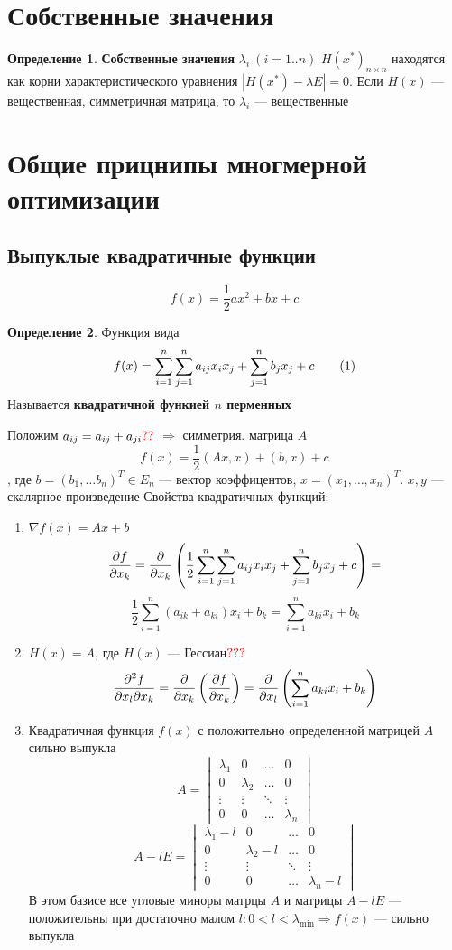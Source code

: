 \documentclass[oneside]{book}
\newcommand\addtag{\refstepcounter{equation}\tag{\theequation}}
\theoremstyle{plain}
\theoremstyle{remark}
\theoremstyle{definition}
\newtheorem*{definition}{Определение}
\begin{document}
\section{Собственные значения}
\label{sec:orgc81b7ec}
\begin{definition}
\textbf{Собственные значения} \(\lambda_i\ (i = 1..n)\) \(H(x^*)_{n\times n}\) находятся как корни характеристического уравнения \(|H(x^*) - \lambda E| = 0\). Если \(H(x)\) --- вещественная, симметричная матрица, то \(\lambda_i\) --- вещественные
\end{definition}
\section{Общие прицнипы многмерной оптимизации}
\label{sec:org3689cce}
\subsection{Выпуклые квадратичные функции}
\label{sec:orgb4e7a9f}
\[ f(x) = \frac{1}{2}ax^2 + bx + c \]
\begin{definition}
Функция вида
\[ f(x) = \sum^n_{i = 1}\sum^n_{j = 1}a_{ij}x_ix_j + \sum^n_{j = 1}b_j x_j + c \addtag\label{7_1_quad} \]
Называется \textbf{квадратичной функией \(n\) перменных}
\end{definition}
Положим \(a_{ij} = a_{ij} + a_{ji} {\color{red}??}\) \(\Rightarrow\) симметрия. матрица \(A\)
\[ f(x) = \frac{1}{2}(Ax, x) + (b, x) + c \]
, где \(b = (b_1, \dots b_n)^T \in E_n\) --- вектор коэффицентов, \(x = (x_1, \dots, x_n)^T\). \(x, y\) --- скалярное произведение
Свойства квадратичных функций:
\begin{enumerate}
\item \(\nabla f(x) = Ax + b\)
\[ \frac{\partial f}{\partial x_k} = \frac{\partial }{\partial x_k}\left(\frac{1}{2}\sum^n_{i = 1}\sum^n_{j = 1}a_{ij}x_ix_j + \sum^n_{j = 1}b_j x_j + c\right) = \]
\[ \frac{1}{2}\sum^n_{i = 1}(a_{ik} + a_{ki})x_i + b_k = \sum^n_{i = 1} a_{ki}x_i + b_k \]
\item \(H(x) = A\), где \(H(x)\) --- Гессиан\(\color{red}???\) 
\[ \frac{\partial ^2 f}{\partial x_l \partial x_k} = \frac{\partial }{\partial x_k}\left(\frac{\partial f}{\partial x_k}\right) = \frac{\partial }{\partial x_l}\left(\sum^n_{i = 1} a_{ki} x_i + b_k\right) \]
\item Квадратичная функция \(f(x)\) с положительно определенной матрицей \(A\) сильно выпукла
\[ A = \begin{vmatrix} \lambda_1 & 0 & \dots & 0 \\ 0 & \lambda_2 & \dots & 0 \\ \vdots & \vdots & \ddots & \vdots \\ 0 & 0 & \dots & \lambda_n \end{vmatrix} \]
\[ A - lE = \begin{vmatrix} \lambda_1 - l & 0 & \dots & 0 \\ 0 & \lambda_2 - l & \dots & 0 \\ \vdots & \vdots & \ddots & \vdots \\ 0 & 0 & \dots & \lambda_n - l \end{vmatrix} \]
В этом базисе все угловые миноры матрцы \(A\) и матрицы \(A - lE\) --- положительны при достаточно малом \(l: 0 < l < \lambda_\min \Rightarrow f(x)\) --- сильно выпукла
\end{enumerate}
\end{document}
